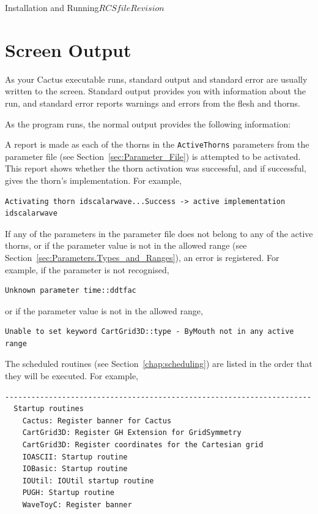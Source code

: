 \begin{cactuspart}{Installation and Running}{$RCSfile$}{$Revision$}
\section{Screen Output}

As your Cactus executable runs, standard output and standard error
are usually written to the screen. Standard output provides you
with information about the run, and standard error reports warnings
and errors from the flesh and thorns.

As the program runs, the normal output provides the following information:

\begin{Lentry}

\item [Active thorns]
        A report is made as each of the thorns in the \texttt{ActiveThorns}
parameters from the parameter file (see Section~\ref{sec:Parameter_File})
is attempted to be activated. This report
shows whether the thorn activation was successful, and if successful, gives the
thorn's implementation. For example,

\begin{verbatim}
Activating thorn idscalarwave...Success -> active implementation idscalarwave
\end{verbatim}

\item [Failed parameters]
         If any of the parameters in the parameter file does not belong to any
of the active thorns, or if the parameter value is not in the allowed range
(see Section~\ref{sec:Parameters.Types_and_Ranges}),
an error is registered. For example, if the parameter is not recognised,

\begin{verbatim}
Unknown parameter time::ddtfac
\end{verbatim}
or if the parameter value is not in the allowed range,

\begin{verbatim}
Unable to set keyword CartGrid3D::type - ByMouth not in any active range
\end{verbatim}

\item [Scheduling information]
        The scheduled routines (see Section~\ref{chap:scheduling})
are listed in the order that they will be executed. For example,

\begin{verbatim}
----------------------------------------------------------------------
  Startup routines
    Cactus: Register banner for Cactus
    CartGrid3D: Register GH Extension for GridSymmetry
    CartGrid3D: Register coordinates for the Cartesian grid
    IOASCII: Startup routine
    IOBasic: Startup routine
    IOUtil: IOUtil startup routine
    PUGH: Startup routine
    WaveToyC: Register banner


\end{verbatim}
\end{Lentry}
\end{cactuspart}
